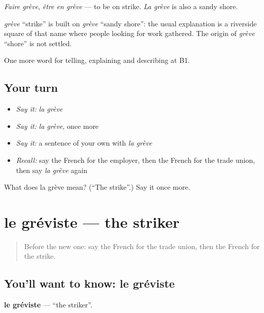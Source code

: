 \emph{Faire grève}, \emph{être en grève} — to be on strike. \emph{La grève} is also a sandy shore.

\begin{cousinweb}
\emph{grève} \textquotedblleft{}strike\textquotedblright{} is built on \emph{grève} \textquotedblleft{}sandy shore\textquotedblright{}: the usual explanation is a riverside square of that name where people looking for work gathered. The origin of \emph{grève} \textquotedblleft{}shore\textquotedblright{} is not settled.
\end{cousinweb}

\begin{grammarlens}[title={What you've built}]
One more word for telling, explaining and describing at B1.
\end{grammarlens}

\subsection*{Your turn}
\begin{itemize}
\raggedright
  \item \emph{Say it:} \emph{la grève}
  \item \emph{Say it:} \emph{la grève}, once more
  \item \emph{Say it:} a sentence of your own with \emph{la grève}
  \item \emph{Recall:} say the French for the employer, then the French for the trade union, then say \emph{la grève} again
\end{itemize}

\begin{tcolorbox}[breakable,colback=teal!4,colframe=teal!35!black,title={Before you move on}]
What does la grève mean? (\textquotedblleft{}The strike\textquotedblright{}.) Say it once more.
\end{tcolorbox}
\section[le gréviste]{le gréviste — the striker}

\label{lesson:FR-C358-greviste}



\begin{quote}
Before the new one: say the French for the trade union, then the French for the strike.
\end{quote}

\subsection*{You'll want to know: le gréviste}
\textbf{le gréviste} — \textquotedblleft{}the striker\textquotedblright{}.

